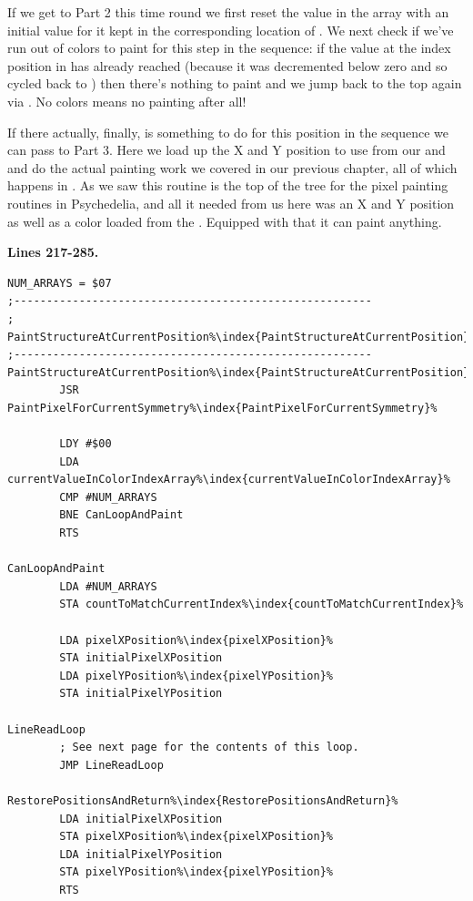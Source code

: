 If we get to Part 2 this time round we first reset the value in the  array with an initial value for it kept in the corresponding
location of . We next check if we've run out of colors to paint for this step
in the sequence: if the value at the index position in  has already reached  (because
it was decremented below zero and so cycled back to ) then there's nothing to paint and we jump back to the top
again via . No colors means no painting after all!

If there actually, finally, is something to do for this position in the sequence we can pass to Part 3. Here we load up the X and Y
position to use from our  and  and do the actual painting work we covered
in our previous chapter, all of which happens in . As we saw this routine is the top of the
tree for the pixel painting routines in Psychedelia, and all it needed from us here was an X and Y position as well as a color
loaded from the . Equipped with that it can paint anything. 

\clearpage
\textbf{Lines 217-285. }
\begin{lstlisting}[caption = The routine responsible for orchestrating the pattern painting.,escapechar=\%]
NUM_ARRAYS = $07
;-------------------------------------------------------
; PaintStructureAtCurrentPosition%\index{PaintStructureAtCurrentPosition}%
;-------------------------------------------------------
PaintStructureAtCurrentPosition%\index{PaintStructureAtCurrentPosition}%   
        JSR PaintPixelForCurrentSymmetry%\index{PaintPixelForCurrentSymmetry}%

        LDY #$00
        LDA currentValueInColorIndexArray%\index{currentValueInColorIndexArray}%
        CMP #NUM_ARRAYS
        BNE CanLoopAndPaint
        RTS 

CanLoopAndPaint   
        LDA #NUM_ARRAYS
        STA countToMatchCurrentIndex%\index{countToMatchCurrentIndex}%
       
        LDA pixelXPosition%\index{pixelXPosition}%
        STA initialPixelXPosition
        LDA pixelYPosition%\index{pixelYPosition}%
        STA initialPixelYPosition

LineReadLoop   
        ; See next page for the contents of this loop.
        JMP LineReadLoop

RestorePositionsAndReturn%\index{RestorePositionsAndReturn}%   
        LDA initialPixelXPosition
        STA pixelXPosition%\index{pixelXPosition}%
        LDA initialPixelYPosition
        STA pixelYPosition%\index{pixelYPosition}%
        RTS 

\end{lstlisting}
\clearpage

